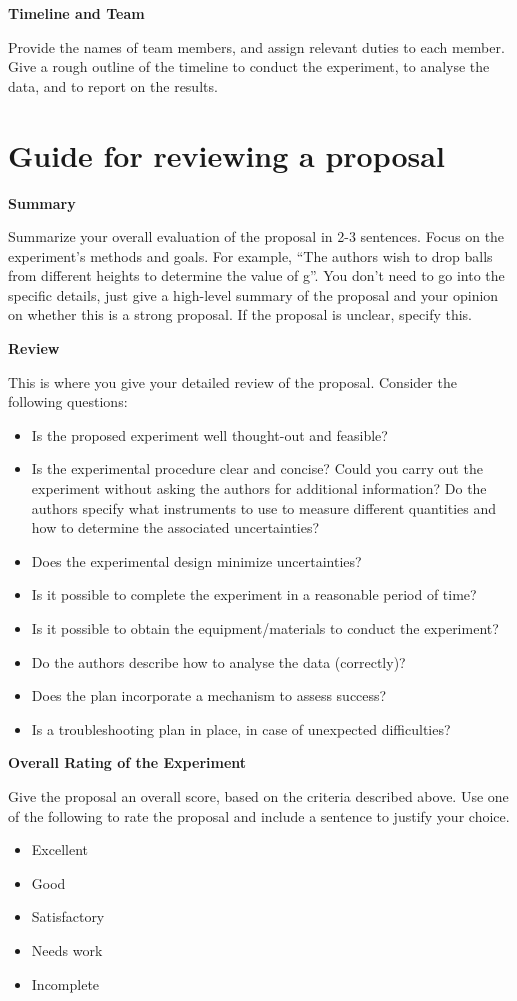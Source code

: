 \textbf{Timeline and Team}

Provide the names of team members, and assign relevant duties to each member. Give a rough outline of the timeline to conduct the experiment, to analyse the data, and to report on the results.

\newpage
\section{Guide for reviewing a proposal}
 \vspace{0.25cm}
\textbf{Summary}

Summarize your overall evaluation of the proposal in 2-3 sentences. Focus on the experiment's methods and goals. For example, ``The authors wish to drop balls from different heights to determine the value of g''. You don't need to go into the specific details, just give a high-level summary of the proposal and your opinion on whether this is a strong proposal. If the proposal is unclear, specify this.

\textbf{Review}

This is where you give your detailed review of the proposal. Consider the following questions:
\begin{itemize}
\item Is the proposed experiment well thought-out and feasible?
\item Is the experimental procedure clear and concise? Could you carry out the experiment without asking the authors for additional information? Do the authors specify what instruments to use to measure different quantities and how to determine the associated uncertainties?
\item Does the experimental design minimize uncertainties?
\item Is it possible to complete the experiment in a reasonable period of time?
\item Is it possible to obtain the equipment/materials to conduct the experiment?
\item Do the authors describe how to analyse the data (correctly)?
\item Does the plan incorporate a mechanism to assess success?
\item Is a troubleshooting plan in place, in case of unexpected difficulties?
\end{itemize}

\textbf{Overall Rating of the Experiment}

Give the proposal an overall score, based on the criteria described above. Use one of the following to rate the proposal and include a sentence to justify your choice.
\begin{itemize}
\item Excellent
\item Good
\item Satisfactory
\item Needs work
\item Incomplete
\end{itemize}

